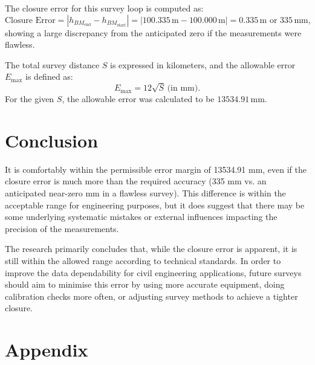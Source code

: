 \documentclass[12pt]{report}
\begin{document}
The closure error for this survey loop is computed as:
\[
\text{Closure Error} = |h_{BM_{\text{end}}} - h_{BM_{\text{start}}}| = |100.335 \, \text{m} - 100.000 \, \text{m}| = 0.335 \, \text{m} \text{ or } 335 \, \text{mm},
\]
showing a large discrepancy from the anticipated zero if the measurements were flawless.

The total survey distance \( S \) is expressed in kilometers, and the allowable error \( E_{\max} \) is defined as:
\[
E_{\max} = 12 \sqrt{S} \, \text{(in mm)}.
\]
For the given \( S \), the allowable error was calculated to be \( 13534.91 \, \text{mm} \).



\section*{Conclusion}

It is comfortably within the permissible error margin of 13534.91 mm, even if the closure error is much more than the required accuracy (335 mm vs. an anticipated near-zero mm in a flawless survey). This difference is within the acceptable range for engineering purposes, but it does suggest that there may be some underlying systematic mistakes or external influences impacting the precision of the measurements. 

The research primarily concludes that, while the closure error is apparent, it is still within the allowed range according to technical standards. In order to improve the data dependability for civil engineering applications, future surveys should aim to minimise this error by using more accurate equipment, doing calibration checks more often, or adjusting survey methods to achieve a tighter closure.  

\newpage
\section*{Appendix}
\end{document}
